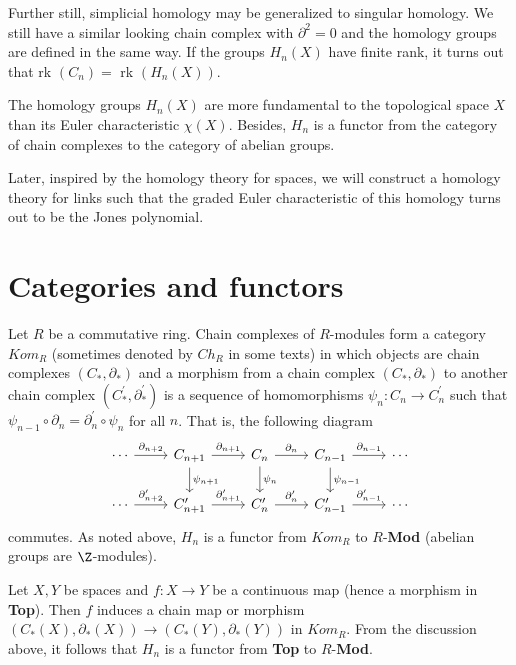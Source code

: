 Further still, simplicial homology may be generalized to singular homology. We still have a similar looking chain complex with $\partial^2 = 0$ and the homology groups are defined in the same way. If the groups $H_n(X)$ have finite rank, it turns out that rk $(C_n) = $ rk $(H_n(X))$.

The homology groups $H_n(X)$ are more fundamental to the topological space $X$ than its Euler characteristic $\chi(X)$. Besides, $H_n$ is a functor from the category of chain complexes to the category of abelian groups.

Later, inspired by the homology theory for spaces, we will construct a homology theory for links such that the graded Euler characteristic of this homology turns out to be the Jones polynomial.

\section{Categories and functors}

Let $R$ be a commutative ring. Chain complexes of $R$-modules form a category $Kom_R$ (sometimes denoted by $Ch_R$ in some texts) in which objects are chain complexes $(C_{*},\partial_{*})$ and a morphism from a chain complex $(C_{*},\partial_{*})$ to another chain complex $(C^{\prime}_{*}, \partial^{\prime}_{*})$ is a sequence of homomorphisms $\psi_n : C_n \to C^{\prime}_n$ such that $\psi_{n-1} \circ \partial_n = \partial^{\prime}_n \circ \psi_n$ for all $n$. That is, the following diagram
\begin{equation}
\label{eq:6}
\begin{tikzcd} 
  \cdots \arrow[r, "\partial_{n+2}"] & C_{n+1} \arrow[r, "\partial_{n+1}"] \arrow[d, "\psi_{n+1}"] & C_n \arrow[r, "\partial_n"] \arrow[d, "\psi_n"] & C_{n-1} \arrow[d, "\psi_{n-1}"] \arrow[r, "\partial_{n-1}"] & \cdots\\
  \cdots \arrow[r, "\partial^{\prime}_{n+2}"] & C^{\prime}_{n+1} \arrow[r, "\partial^{\prime}_{n+1}"] &  C^{\prime}_{n} \arrow[r, "\partial^{\prime}_n"] & C^{\prime}_{n-1} \arrow[r, "\partial^{\prime}_{n-1}"] & \cdots
\end{tikzcd}
\end{equation}
commutes. As noted above, $H_n$ is a functor from $Kom_R$ to $R$-\textbf{Mod} (abelian groups are $\Z$-modules).

Let $X, Y$ be spaces and $f: X \to Y$ be a continuous map (hence a morphism in \textbf{Top}). Then $f$ induces a chain map or morphism $(C_{*}(X), \partial_{*}(X)) \to (C_{*}(Y), \partial_{*}(Y))$ in $Kom_R$. From the discussion above, it follows that $H_n$ is a functor from \textbf{Top} to $R$-\textbf{Mod}.

